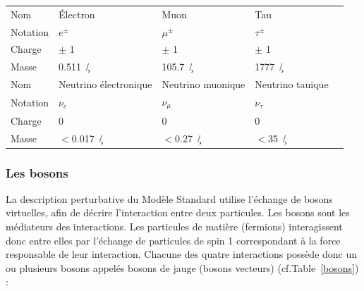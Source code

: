 \begin{table}[H]
\begin{tabular}{|O|O|O|O|N}
		\hline
		 Nom &  Électron &  Muon &  Tau \\
		 Notation &  $e^{\pm}$ &  $\mu^{\pm}$ &  $\tau^{\pm}$ \\
		 Charge &  $\pm$ \num{1} &  $\pm$ \num{1} &  $\pm$ \num{1} \\
		 Masse &  \SI{0.511}{\mega\eV/\square\c} &  \SI{105.7}{\mega\eV/\square\c}&  \SI{1777}{\giga\eV/\square\c} \\
		\hline 
		 Nom &  Neutrino électronique &  Neutrino muonique &  Neutrino tauique \\
		 Notation &  $\nu_{e}$ &  $\nu_{\mu}$ &  $\nu_{\tau}$ \\
		 Charge &  \num{0} &  \num{0} &  \num{0} \\
		 Masse &  $<$\SI{0.017}{\mega\eV/\square\c} & $<$\SI{0.27}{\mega\eV/\square\c}  & $<$\SI{35}{\mega\eV/\square\c}\\
	\hline
\end{tabular} 
\label{fermions}
\end{table}	

\subsubsection{Les bosons}
La description perturbative du Modèle Standard utilise l'échange de bosons virtuelles, afin de décrire l'interaction entre deux particules. Les bosons sont les médiateurs des interactions. Les particules de matière (fermions) interagissent donc entre elles par l'échange de particules de spin \num{1} correspondant à la force responsable de leur interaction.
\smallskip
Chacune des quatre interactions possède donc un ou plusieurs bosons appelés bosons de jauge (bosons vecteurs) (cf.Table~\ref{bosons}) :

